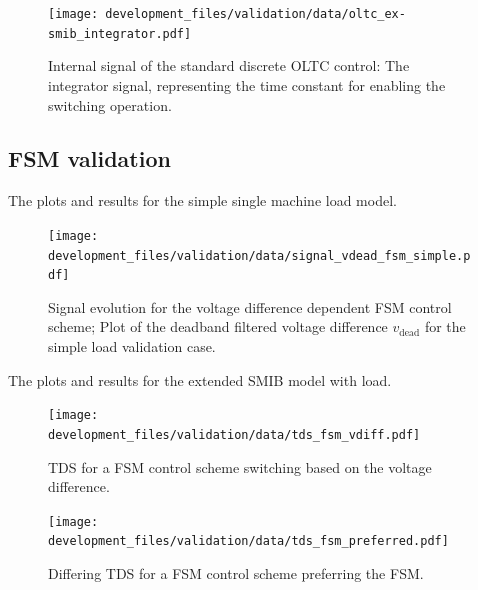 \begin{figure}[H]
    \centering
    \texttt{[image: development\_files/validation/data/oltc\_ex-smib\_integrator.pdf]}
    \caption{Internal signal of the standard discrete \acs{OLTC} control: The integrator signal, representing the time constant for enabling the switching operation.}
    \label{fig:int-signal-oltc-ext-smib-integrator}
\end{figure}

\subsection{FSM validation}

The plots and results for the simple single machine load model.

\begin{figure}[H]
    \centering
    \texttt{[image: development\_files/validation/data/signal\_vdead\_fsm\_simple.pdf]}
    \caption{Signal evolution for the voltage difference dependent \acs{FSM} control scheme; Plot of the deadband filtered voltage difference $v_\mathrm{dead}$ for the simple load validation case.}
    \label{fig:signal-vdead-fsm-simple}
\end{figure}

The plots and results for the extended \acs{SMIB} model with load.

\begin{figure}[H]
    \centering
    \texttt{[image: development\_files/validation/data/tds\_fsm\_vdiff.pdf]}
    \caption[\acs{TDS} for a \acs{FSM} control scheme switching based on the voltage difference]{\acs{TDS} for a \acs{FSM} control scheme switching based on the voltage difference.}
    \label{fig:tds-fsm-vdiff-ext-smib}
\end{figure}

\begin{figure}[H]
    \centering
    \texttt{[image: development\_files/validation/data/tds\_fsm\_preferred.pdf]}
    \caption[Differing \acs{TDS} for a \acs{FSM} control scheme preferring the \acs{FSM}]{Differing \acs{TDS} for a \acs{FSM} control scheme preferring the \acs{FSM}.}
    \label{fig:tds-fsm-preferred}
\end{figure}